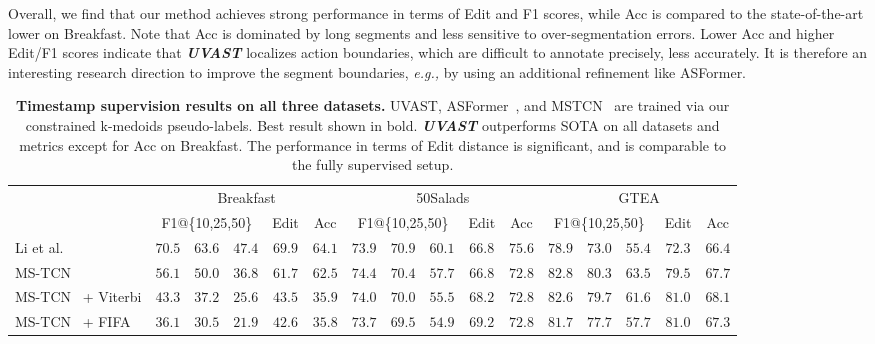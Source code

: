 Overall, we find that our method achieves strong performance in terms of Edit and F1 scores, while Acc is compared to the state-of-the-art lower on Breakfast. Note that Acc is dominated by long segments and less sensitive to over-segmentation errors. Lower Acc and higher Edit/F1 scores indicate that \textit{\textbf{UVAST}} localizes action boundaries, which are difficult to annotate precisely, less accurately. It is therefore an interesting research direction to improve the segment boundaries, \textit{e.g.,} by using an additional refinement like ASFormer.      

\begin{table}[t!]
\begin{center}
\caption{
\textbf{Timestamp supervision results on all three datasets.}
UVAST, ASFormer~\cite{asformer}, and MSTCN~\cite{farha2019ms} are trained via our constrained k-medoids pseudo-labels. Best result shown in bold. \textbf{\textit{UVAST}} outperforms SOTA on all datasets and metrics except for Acc on Breakfast. The performance in terms of Edit distance is significant, and is comparable to the fully supervised setup.
}
\label{tab:timestamp}
\resizebox{\linewidth}{!} {
\begin{tabular}{ll|ccc|c|c||ccc|c|c||ccc|c|c}
\hline 
\hline 
\multicolumn{2}{l|}{} & \multicolumn{5}{c||}{{Breakfast}} & \multicolumn{5}{c||}{{50Salads}} & \multicolumn{5}{c}{{GTEA}}\\
\cline{3-17} 
 &  & \multicolumn{3}{c|}{{F1@\{10,25,50\}}} & Edit & Acc & \multicolumn{3}{c|}{{F1@\{10,25,50\}}} & Edit & Acc & \multicolumn{3}{c|}{{F1@\{10,25,50\}}} & Edit & Acc \\
\hline 
\multicolumn{2}{l|}{Li et al. \cite{timestamp2021}} & $70.5$ & $63.6$ & $47.4$ & $69.9$ & $\mathbf{64.1}$ & $73.9$ & $70.9$ & $60.1$ & $66.8$ & $75.6$ & $78.9$ & $73.0$ & $55.4$ & $72.3$ & $66.4$\\
\multicolumn{2}{l|}{MS-TCN~\cite{farha2019ms}} & $56.1$ & $50.0$ & $36.8$ & $61.7$ & $62.5$ & $74.4$ & $70.4$ & $57.7$ & $66.8$ & $72.8$ & $82.8$ & $80.3$ & $63.5$ & $79.5$ & $67.7$\\
\multicolumn{2}{l|}{MS-TCN~\cite{farha2019ms} + Viterbi} & $43.3$ & $37.2$ & $25.6$ & $43.5$ & $35.9$ & $74.0$ & $70.0$ & $55.5$ & $68.2$ & $72.8$ & $82.6$ & $79.7$ & $61.6$ & $81.0$ & $68.1$\\
\multicolumn{2}{l|}{MS-TCN~\cite{farha2019ms} + FIFA} & $36.1$ & $30.5$ & $21.9$ & $42.6$ & $35.8$ & $73.7$ & $69.5$ & $54.9$ & $69.2$ & $72.8$ & $81.7$ & $77.7$ & $57.7$ & $81.0$ & $67.3$ \\

\end{tabular}}
\end{center}
\end{table}
